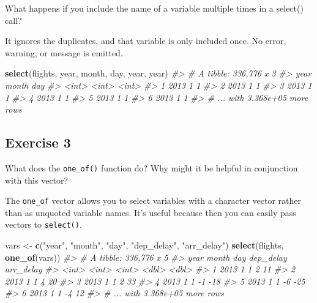 \documentclass[]{book}
\newenvironment{Shaded}{\begin{snugshade}}{\end{snugshade}}
\newcommand{\CommentTok}[1]{\textcolor[rgb]{0.56,0.35,0.01}{\textit{#1}}}
\newcommand{\KeywordTok}[1]{\textcolor[rgb]{0.13,0.29,0.53}{\textbf{#1}}}
\newcommand{\NormalTok}[1]{#1}
\newcommand{\StringTok}[1]{\textcolor[rgb]{0.31,0.60,0.02}{#1}}
\theoremstyle{plain}
\theoremstyle{remark}
\theoremstyle{definition}
\theoremstyle{definition}
\theoremstyle{definition}
\theoremstyle{remark}
\begin{document}
What happens if you include the name of a variable multiple times in a
select() call?

It ignores the duplicates, and that variable is only included once. No
error, warning, or message is emitted.

\begin{Shaded}
\begin{Highlighting}[]
\KeywordTok{select}\NormalTok{(flights, year, month, day, year, year)}
\CommentTok{#> # A tibble: 336,776 x 3}
\CommentTok{#>    year month   day}
\CommentTok{#>   <int> <int> <int>}
\CommentTok{#> 1  2013     1     1}
\CommentTok{#> 2  2013     1     1}
\CommentTok{#> 3  2013     1     1}
\CommentTok{#> 4  2013     1     1}
\CommentTok{#> 5  2013     1     1}
\CommentTok{#> 6  2013     1     1}
\CommentTok{#> # ... with 3.368e+05 more rows}
\end{Highlighting}
\end{Shaded}

\hypertarget{exercise-3-7}{%
\subsection{Exercise 3}\label{exercise-3-7}}

What does the \texttt{one\_of()} function do? Why might it be helpful in
conjunction with this vector?

The \texttt{one\_of} vector allows you to select variables with a
character vector rather than as unquoted variable names. It's useful
because then you can easily pass vectors to \texttt{select()}.

\begin{Shaded}
\begin{Highlighting}[]
\NormalTok{vars <-}\StringTok{ }\KeywordTok{c}\NormalTok{(}\StringTok{"year"}\NormalTok{, }\StringTok{"month"}\NormalTok{, }\StringTok{"day"}\NormalTok{, }\StringTok{"dep_delay"}\NormalTok{, }\StringTok{"arr_delay"}\NormalTok{)}
\KeywordTok{select}\NormalTok{(flights, }\KeywordTok{one_of}\NormalTok{(vars))}
\CommentTok{#> # A tibble: 336,776 x 5}
\CommentTok{#>    year month   day dep_delay arr_delay}
\CommentTok{#>   <int> <int> <int>     <dbl>     <dbl>}
\CommentTok{#> 1  2013     1     1         2        11}
\CommentTok{#> 2  2013     1     1         4        20}
\CommentTok{#> 3  2013     1     1         2        33}
\CommentTok{#> 4  2013     1     1        -1       -18}
\CommentTok{#> 5  2013     1     1        -6       -25}
\CommentTok{#> 6  2013     1     1        -4        12}
\CommentTok{#> # ... with 3.368e+05 more rows}
\end{Highlighting}
\end{Shaded}
\end{document}
